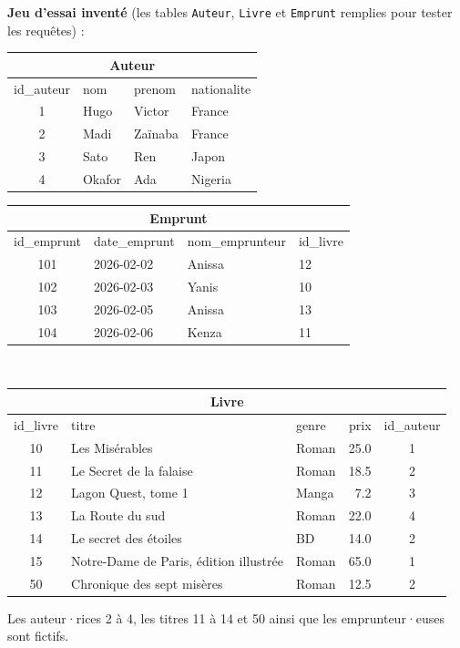 \documentclass[11pt, a4paper]{exam}
\newcommand{\code}[1]{\texttt{#1}}
\begin{document}
\textbf{Jeu d'essai inventé} (les tables \code{Auteur}, \code{Livre} et \code{Emprunt} remplies pour tester les requêtes) :
\begin{center}\footnotesize
\begin{tabular}{|c|l|l|l|}\hline
\multicolumn{4}{|c|}{\textbf{Auteur}}\\\hline
id\_auteur & nom & prenom & nationalite \\\hline
1 & Hugo & Victor & France \\
2 & Madi & Zaïnaba & France \\
3 & Sato & Ren & Japon \\
4 & Okafor & Ada & Nigeria \\\hline
\end{tabular}\quad
\begin{tabular}{|c|l|l|l|}\hline
\multicolumn{4}{|c|}{\textbf{Emprunt}}\\\hline
id\_emprunt & date\_emprunt & nom\_emprunteur & id\_livre \\\hline
101 & 2026-02-02 & Anissa & 12 \\
102 & 2026-02-03 & Yanis & 10 \\
103 & 2026-02-05 & Anissa & 13 \\
104 & 2026-02-06 & Kenza & 11 \\\hline
\end{tabular}\\[0.6em]
\begin{tabular}{|c|l|l|r|c|}\hline
\multicolumn{5}{|c|}{\textbf{Livre}}\\\hline
id\_livre & titre & genre & prix & id\_auteur \\\hline
10 & Les Misérables & Roman & 25.0 & 1 \\
11 & Le Secret de la falaise & Roman & 18.5 & 2 \\
12 & Lagon Quest, tome 1 & Manga & 7.2 & 3 \\
13 & La Route du sud & Roman & 22.0 & 4 \\
14 & Le secret des étoiles & BD & 14.0 & 2 \\
15 & Notre-Dame de Paris, édition illustrée & Roman & 65.0 & 1 \\
50 & Chronique des sept misères & Roman & 12.5 & 2 \\\hline
\end{tabular}
\end{center}
{\small Les auteur·rices 2 à 4, les titres 11 à 14 et 50 ainsi que les emprunteur·euses sont fictifs.}
\end{document}
